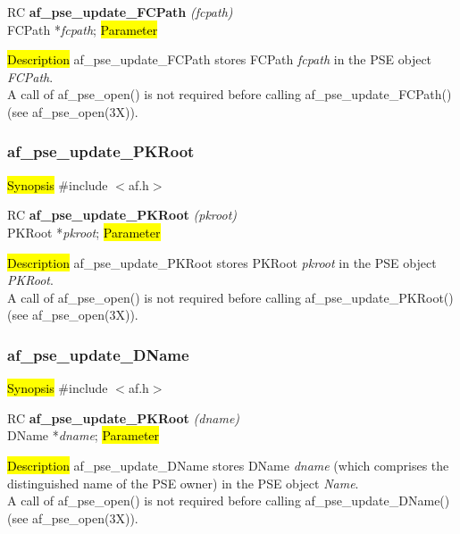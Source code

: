 RC {\bf af\_pse\_update\_FCPath} {\em (fcpath)} \\
FCPath *{\em fcpath};
\hl{Parameter}

\hl{Description}
af\_pse\_update\_FCPath stores FCPath {\em fcpath} in the PSE object
{\em FCPath}.
\\ [1em]
A call of af\_pse\_open() is not required before calling af\_pse\_update\_FCPath()
(see af\_pse\_open(3X)).

\subsubsection{af\_pse\_update\_PKRoot}
\label{af_update_PKRoot}

\hl{Synopsis}
\#include $<$af.h$>$ 

RC {\bf af\_pse\_update\_PKRoot} {\em (pkroot)} \\
PKRoot *{\em pkroot};
\hl{Parameter}


\hl{Description}
af\_pse\_update\_PKRoot stores PKRoot {\em pkroot} in the PSE object {\em PKRoot}.
\\ [1em]
A call of af\_pse\_open() is not required before calling af\_pse\_update\_PKRoot()
(see af\_pse\_open(3X)).

\subsubsection{af\_pse\_update\_DName}
\label{af_update_DName}
\hl{Synopsis}
\#include $<$af.h$>$ 

RC {\bf af\_pse\_update\_PKRoot} {\em (dname)} \\
DName *{\em dname};
\hl{Parameter}

\hl{Description}
af\_pse\_update\_DName stores DName {\em dname} (which comprises the distinguished name
of the PSE owner) in the PSE object {\em Name}.
\\ [1em]
A call of af\_pse\_open() is not required before calling af\_pse\_update\_DName()
(see af\_pse\_open(3X)).

